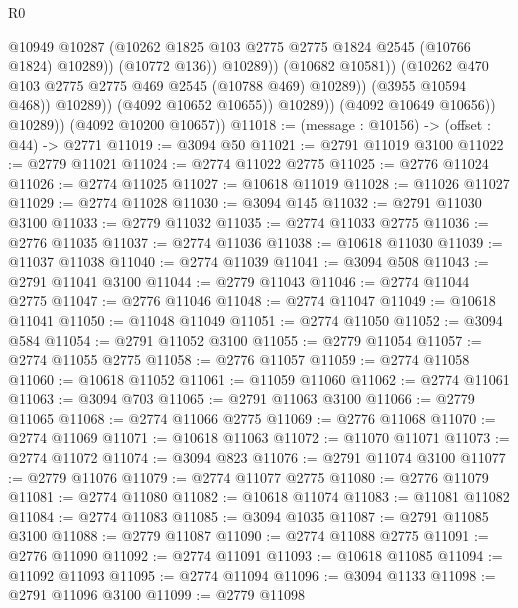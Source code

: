 \begin{lexlean}{R0}
\begin{coremodule}
                                    @10949
                                    @10287
                                    (@10262
                                      @1825
                                      @103
                                      @2775
                                      @2775
                                      @1824
                                      @2545
                                      (@10766 @1824)
                                      @10289))
                                  (@10772 @136))
                                @10289))
                            (@10682 @10581))
                          (@10262 @470 @103 @2775 @2775 @469 @2545 (@10788 @469) @10289))
                        (@3955 @10594 @468))
                      @10289))
                  (@4092 @10652 @10655))
                @10289))
            (@4092 @10649 @10656))
          @10289))
      (@4092 @10200 @10657))
@11018 := (message : @10156) -> (offset : @44) -> @2771
@11019 := @3094 @50
@11021 := @2791 @11019 @3100
@11022 := @2779 @11021
@11024 := @2774 @11022 @2775
@11025 := @2776 @11024
@11026 := @2774 @11025
@11027 := @10618 @11019
@11028 := @11026 @11027
@11029 := @2774 @11028
@11030 := @3094 @145
@11032 := @2791 @11030 @3100
@11033 := @2779 @11032
@11035 := @2774 @11033 @2775
@11036 := @2776 @11035
@11037 := @2774 @11036
@11038 := @10618 @11030
@11039 := @11037 @11038
@11040 := @2774 @11039
@11041 := @3094 @508
@11043 := @2791 @11041 @3100
@11044 := @2779 @11043
@11046 := @2774 @11044 @2775
@11047 := @2776 @11046
@11048 := @2774 @11047
@11049 := @10618 @11041
@11050 := @11048 @11049
@11051 := @2774 @11050
@11052 := @3094 @584
@11054 := @2791 @11052 @3100
@11055 := @2779 @11054
@11057 := @2774 @11055 @2775
@11058 := @2776 @11057
@11059 := @2774 @11058
@11060 := @10618 @11052
@11061 := @11059 @11060
@11062 := @2774 @11061
@11063 := @3094 @703
@11065 := @2791 @11063 @3100
@11066 := @2779 @11065
@11068 := @2774 @11066 @2775
@11069 := @2776 @11068
@11070 := @2774 @11069
@11071 := @10618 @11063
@11072 := @11070 @11071
@11073 := @2774 @11072
@11074 := @3094 @823
@11076 := @2791 @11074 @3100
@11077 := @2779 @11076
@11079 := @2774 @11077 @2775
@11080 := @2776 @11079
@11081 := @2774 @11080
@11082 := @10618 @11074
@11083 := @11081 @11082
@11084 := @2774 @11083
@11085 := @3094 @1035
@11087 := @2791 @11085 @3100
@11088 := @2779 @11087
@11090 := @2774 @11088 @2775
@11091 := @2776 @11090
@11092 := @2774 @11091
@11093 := @10618 @11085
@11094 := @11092 @11093
@11095 := @2774 @11094
@11096 := @3094 @1133
@11098 := @2791 @11096 @3100
@11099 := @2779 @11098

\end{coremodule}
\end{lexlean}
